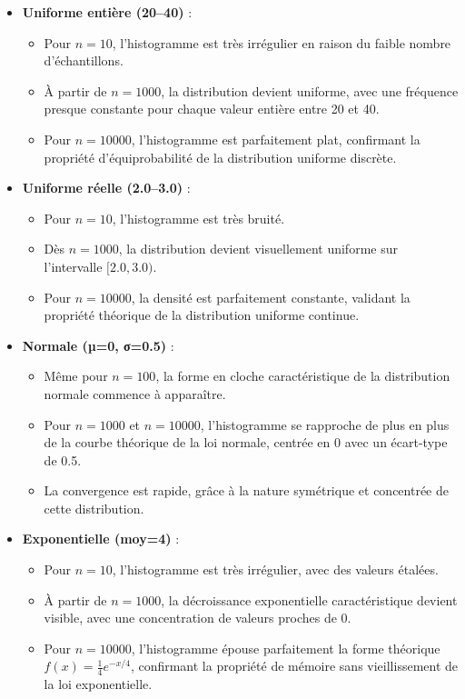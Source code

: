 \documentclass{article}
\begin{document}
\begin{itemize}[leftmargin=*, noitemsep]
    \item \textbf{Uniforme entière (20–40)} :
    \begin{itemize}[leftmargin=*, noitemsep]
        \item Pour \( n = 10 \), l'histogramme est très irrégulier en raison du faible nombre d'échantillons.
        \item À partir de \( n = 1000 \), la distribution devient uniforme, avec une fréquence presque constante pour chaque valeur entière entre 20 et 40.
        \item Pour \( n = 10000 \), l'histogramme est parfaitement plat, confirmant la propriété d'équiprobabilité de la distribution uniforme discrète.
    \end{itemize}

    \item \textbf{Uniforme réelle (2.0–3.0)} :
    \begin{itemize}[leftmargin=*, noitemsep]
        \item Pour \( n = 10 \), l'histogramme est très bruité.
        \item Dès \( n = 1000 \), la distribution devient visuellement uniforme sur l'intervalle \([2.0, 3.0)\).
        \item Pour \( n = 10000 \), la densité est parfaitement constante, validant la propriété théorique de la distribution uniforme continue.
    \end{itemize}

    \item \textbf{Normale (µ=0, σ=0.5)} :
    \begin{itemize}[leftmargin=*, noitemsep]
        \item Même pour \( n = 100 \), la forme en cloche caractéristique de la distribution normale commence à apparaître.
        \item Pour \( n = 1000 \) et \( n = 10000 \), l'histogramme se rapproche de plus en plus de la courbe théorique de la loi normale, centrée en 0 avec un écart-type de 0.5.
        \item La convergence est rapide, grâce à la nature symétrique et concentrée de cette distribution.
    \end{itemize}

    \item \textbf{Exponentielle (moy=4)} :
    \begin{itemize}[leftmargin=*, noitemsep]
        \item Pour \( n = 10 \), l'histogramme est très irrégulier, avec des valeurs étalées.
        \item À partir de \( n = 1000 \), la décroissance exponentielle caractéristique devient visible, avec une concentration de valeurs proches de 0.
        \item Pour \( n = 10000 \), l'histogramme épouse parfaitement la forme théorique \( f(x) = \frac{1}{4} e^{-x/4} \), confirmant la propriété de mémoire sans vieillissement de la loi exponentielle.
    \end{itemize}


\end{itemize}
\end{document}
